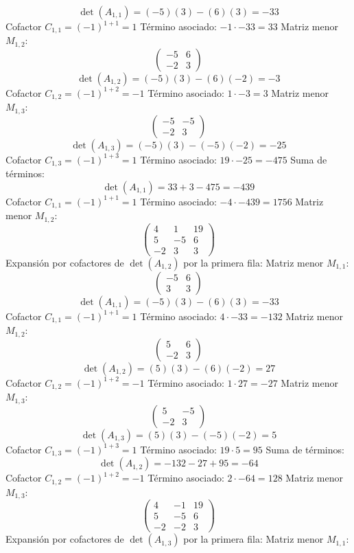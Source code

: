 \documentclass{article}
\begin{document}
\[\det(A_{1,1}) = (-5)(3) - (6)(3) = -33\]
Cofactor $C_{1,1} = (-1)^{1+1} = 1$
Término asociado: $ -1 \cdot -33 = 33 $
Matriz menor $M_{1,2}$:
\[\begin{pmatrix}-5 & 6 \\ -2 & 3\end{pmatrix}\]
\[\det(A_{1,2}) = (-5)(3) - (6)(-2) = -3\]
Cofactor $C_{1,2} = (-1)^{1+2} = -1$
Término asociado: $ 1 \cdot -3 = 3 $
Matriz menor $M_{1,3}$:
\[\begin{pmatrix}-5 & -5 \\ -2 & 3\end{pmatrix}\]
\[\det(A_{1,3}) = (-5)(3) - (-5)(-2) = -25\]
Cofactor $C_{1,3} = (-1)^{1+3} = 1$
Término asociado: $ 19 \cdot -25 = -475 $
Suma de términos:
\[\det(A_{1,1}) = 33 + 3 - 475 = -439\]
Cofactor $C_{1,1} = (-1)^{1+1} = 1$
Término asociado: $ -4 \cdot -439 = 1756 $
Matriz menor $M_{1,2}$:
\[\begin{pmatrix}4 & 1 & 19 \\ 5 & -5 & 6 \\ -2 & 3 & 3\end{pmatrix}\]
Expansión por cofactores de $\det(A_{1,2})$ por la primera fila:
Matriz menor $M_{1,1}$:
\[\begin{pmatrix}-5 & 6 \\ 3 & 3\end{pmatrix}\]
\[\det(A_{1,1}) = (-5)(3) - (6)(3) = -33\]
Cofactor $C_{1,1} = (-1)^{1+1} = 1$
Término asociado: $ 4 \cdot -33 = -132 $
Matriz menor $M_{1,2}$:
\[\begin{pmatrix}5 & 6 \\ -2 & 3\end{pmatrix}\]
\[\det(A_{1,2}) = (5)(3) - (6)(-2) = 27\]
Cofactor $C_{1,2} = (-1)^{1+2} = -1$
Término asociado: $ 1 \cdot 27 = -27 $
Matriz menor $M_{1,3}$:
\[\begin{pmatrix}5 & -5 \\ -2 & 3\end{pmatrix}\]
\[\det(A_{1,3}) = (5)(3) - (-5)(-2) = 5\]
Cofactor $C_{1,3} = (-1)^{1+3} = 1$
Término asociado: $ 19 \cdot 5 = 95 $
Suma de términos:
\[\det(A_{1,2}) = -132 - 27 + 95 = -64\]
Cofactor $C_{1,2} = (-1)^{1+2} = -1$
Término asociado: $ 2 \cdot -64 = 128 $
Matriz menor $M_{1,3}$:
\[\begin{pmatrix}4 & -1 & 19 \\ 5 & -5 & 6 \\ -2 & -2 & 3\end{pmatrix}\]
Expansión por cofactores de $\det(A_{1,3})$ por la primera fila:
Matriz menor $M_{1,1}$:
\end{document}
